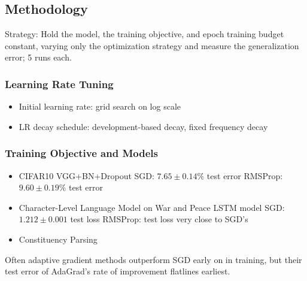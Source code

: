 \documentclass[12pt]{article}
\begin{document}
\subsection{Methodology}
Strategy: Hold the model, the training objective, and epoch training budget constant, varying only the optimization strategy and measure the generalization error; 5 runs each.

\subsubsection{Learning Rate Tuning}
\begin{itemize}
	\item Initial learning rate: grid search on log scale
	\item LR decay schedule: development-based decay, fixed frequency decay
\end{itemize}

\subsubsection{Training Objective and Models}
\begin{itemize}
	\item CIFAR10
		\subitem VGG+BN+Dropout
		\subitem SGD: $7.65 \pm 0.14\%$ test error
		\subitem RMSProp: $9.60 \pm 0.19\%$ test error
	\item Character-Level Language Model on War and Peace
		\subitem LSTM model
		\subitem SGD: $1.212 \pm 0.001$ test loss
		\subitem RMSProp: test loss very close to SGD's
	\item Constituency Parsing
\end{itemize}

Often adaptive gradient methods outperform SGD early on in training, but their test error of AdaGrad's rate of improvement flatlines earliest.
\end{document}

